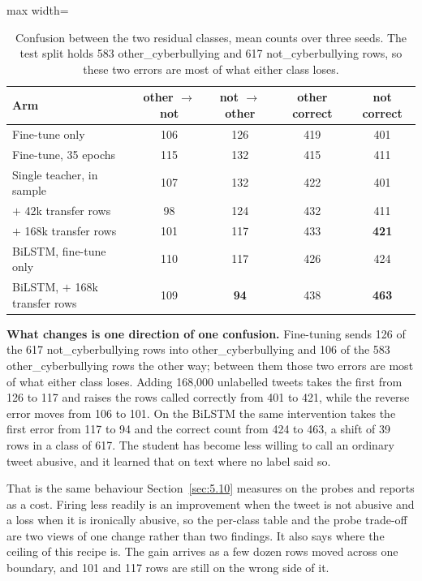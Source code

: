 \begin{table}[htbp]
\centering
\small
\caption[Confusion between the two residual classes]{Confusion between the two residual classes, mean
counts over three seeds. The test split holds 583 other\_cyberbullying and 617 not\_cyberbullying
rows, so these two errors are most of what either class loses.}
\label{tab:confusion}
\begin{adjustbox}{max width=\textwidth}
\begin{tabular}{lcccc}
\toprule
Arm & other $\rightarrow$ not & not $\rightarrow$ other & other correct & not correct \\
\midrule
Fine-tune only & 106 & 126 & 419 & 401 \\
Fine-tune, 35 epochs & 115 & 132 & 415 & 411 \\
Single teacher, in sample & 107 & 132 & 422 & 401 \\
$+$ 42k transfer rows & 98 & 124 & 432 & 411 \\
$+$ 168k transfer rows & 101 & 117 & 433 & \textbf{421} \\
\midrule
BiLSTM, fine-tune only & 110 & 117 & 426 & 424 \\
BiLSTM, $+$ 168k transfer rows & 109 & \textbf{94} & 438 & \textbf{463} \\
\bottomrule
\end{tabular}
\end{adjustbox}
\end{table}

\textbf{What changes is one direction of one confusion.} Fine-tuning sends 126 of the 617
not\_cyberbullying rows into other\_cyberbullying and 106 of the 583 other\_cyberbullying rows the
other way; between them those two errors are most of what either class loses. Adding 168,000
unlabelled tweets takes the first from 126 to 117 and raises the rows called correctly from 401 to
421, while the reverse error moves from 106 to 101. On the BiLSTM the same intervention takes the
first error from 117 to 94 and the correct count from 424 to 463, a shift of 39 rows in a class of
617. The student has become less willing to call an ordinary tweet abusive, and it learned that on
text where no label said so.

That is the same behaviour Section~\ref{sec:5.10} measures on the probes and reports as a cost.
Firing less readily is an improvement when the tweet is not abusive and a loss when it is ironically
abusive, so the per-class table and the probe trade-off are two views of one change rather than two
findings. It also says where the ceiling of this recipe is. The gain arrives as a few dozen rows
moved across one boundary, and 101 and 117 rows are still on the wrong side of it.

